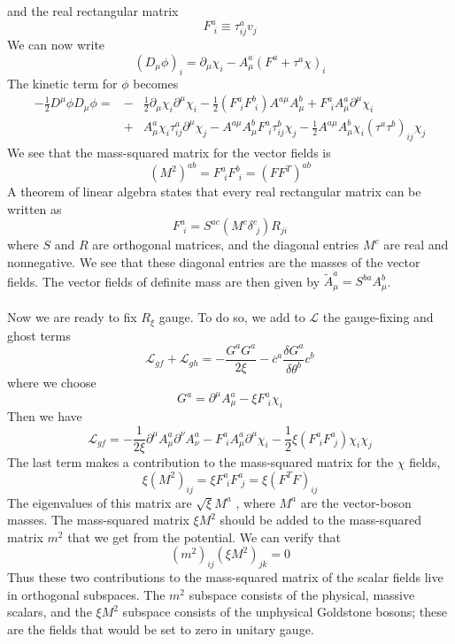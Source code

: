\documentclass[cyan]{elegantnote}
\begin{document}
and the real rectangular matrix
\[F^a_{\phantom{i}i} \equiv \tau^a_{ij}v_j\]
We can now write
\[(D_{\mu}\phi)_i = \partial_{\mu}\chi_i - A^a_{\mu}(F^a+\tau^a\chi)_i\]
The kinetic term for $\phi$ becomes
\begin{eqnarray}
-\frac{1}{2}D^{\mu}\phi D_{\mu}\phi = &-& \frac{1}{2}\partial_{\mu}\chi_i \partial^{\mu}\chi_i - \frac{1}{2}(F^a_{\phantom{i}i} F^b_{\phantom{i}i})A^{a\mu}A^b_{\mu} + F^a_{\phantom{i}i} A^a_{\mu}\partial^{\mu}\chi_i \nonumber \\
&+& A^a_{\mu}\chi_i \tau^a_{ij}\partial^{\mu}\chi_j - A^{a\mu}A^b_{\mu} F^a_{\phantom{i}i} \tau^b_{ij} \chi_j - \frac{1}{2}A^{a\mu}A^b_{\mu}\chi_i (\tau^a \tau^b)_{ij}\chi_j \nonumber
\end{eqnarray}
We see that the mass-squared matrix for the vector fields is
\[(M^2)^{ab} = F^a_{\phantom{i}i} F^b_{\phantom{i}i} = (FF^T)^{ab}\]
A theorem of linear algebra states that every real rectangular matrix can be written as
\[F^a_{\phantom{i}i} = S^{ac}(M^c\delta^c_{\phantom{i}j})R_{ji}\]
where $S$ and $R$ are orthogonal matrices, and the diagonal entries $M^c$ are real and nonnegative. We see that these diagonal entries are the masses of the vector fields. The vector fields of definite mass are then given by $\widetilde{A}^{a}_{\mu} = S^{ba}A^b_{\mu}$.
\\ \\
Now we are ready to fix $R_{\xi}$ gauge. To do so, we add to $\mathcal{L}$ the gauge-fixing and ghost terms
\[\mathcal{L}_{gf} + \mathcal{L}_{gh} = - \frac{G^aG^a}{2\xi} - \overline{c}^a\frac{\delta G^a}{\delta \theta^b} c^b \]
where we choose
\[G^a = \partial^{\mu}A^a_{\mu} - \xi F^a_{\phantom{i}i} 
\chi_i\]
Then we have
\[\mathcal{L}_{gf} = -\frac{1}{2\xi} \partial^{\mu}A^a_{\mu} \partial^{\nu}A^a_{\nu} - F^a_{\phantom{i}i} A^a_{\mu}\partial^{\mu}\chi_i - \frac{1}{2}\xi (F^a_{\phantom{i}i} F^a_{\phantom{i}j})\chi_i\chi_j\]
The last term makes a contribution to the mass-squared matrix for the $\chi$ fields,
\[\xi(M^2)_{ij} = \xi F^a_{\phantom{i}i} F^a_{\phantom{i}j} = \xi(F^TF)_{ij}\]
The eigenvalues of this matrix are $\sqrt{\xi}M^a$ , where
$M^a$ are the vector-boson masses. The mass-squared matrix $\xi M^2$ should be added to the mass-squared matrix $m^2$ that we get from the potential. We can verify that
\[(m^2)_{ij}(\xi M^2)_{jk} = 0\]
Thus these two contributions to the mass-squared matrix of the scalar fields live in orthogonal subspaces. The $m^2$ subspace consists of the physical, massive scalars, and the $\xi M^2$ subspace consists of the unphysical Goldstone bosons; these are the fields that would be set to zero in unitary gauge.
\end{document}
